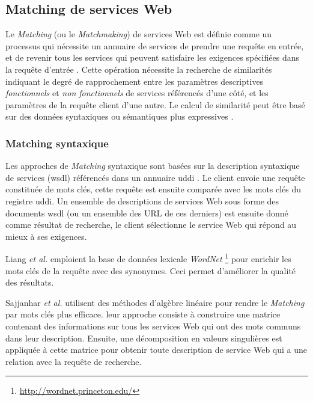   \subsection{Matching de services Web}
  \label{sec:ws-matching}
  Le \textit{Matching} (ou le \textit{Matchmaking}) de services Web
  est définie comme un processus qui nécessite un annuaire de services
  de prendre une requête en entrée, et de revenir tous les services
  qui peuvent satisfaire les exigences spécifiées dans la requête
  d'entrée \cite{li2004software}. Cette opération nécessite la
  recherche de similarités indiquant le degré de rapprochement entre
  les paramètres descriptives \textit{fonctionnels} et \textit{non
    fonctionnels} de services référencés d'une côté, et les paramètres
  de la requête client d'une autre.  Le calcul de similarité peut être
  basé sur des données syntaxiques ou sémantiques plus expressives
  \cite{elie2010}.

    \subsubsection{Matching syntaxique}
    \label{sec:matching-syntactique}
    Les approches de \textit{Matching} syntaxique sont basées sur la
    description syntaxique de services (\acrshort{wsdl}) référencés
    dans un annuaire \acrshort{uddi} \cite{clement2004uddi}. Le client
    envoie une requête constituée de mots clés, cette requête est
    ensuite comparée avec les mots clés du registre
    \acrshort{uddi}. Un ensemble de descriptions de services Web sous
    forme des documents \acrshort{wsdl} (ou un ensemble des
    \textsc{URL} de ces derniers) est ensuite donné comme résultat de
    recherche, le client sélectionne le service Web qui répond au
    mieux à ses exigences.

    Liang \textit{et al.} \cite{DBLP:journals/jwsr/LiangCSCL04}
    emploient la base de données lexicale \textit{WordNet}
    \footnote{\url{http://wordnet.princeton.edu/}}
    \cite{miller1990introduction} pour enrichir les mots clés de la
    requête avec des synonymes. Ceci permet d'améliorer la qualité des
    résultats.

    Sajjanhar \textit{et al.} \cite{sajjanhar2004algorithm} utilisent
    des méthodes d'algèbre linéaire pour rendre le \textit{Matching}
    par mots clés plus efficace. leur approche consiste à construire
    une matrice contenant des informations sur tous les services Web
    qui ont des mots communs dans leur description. Ensuite, une
    décomposition en valeurs singulières est appliquée à cette matrice
    pour obtenir toute description de service Web qui a une relation
    avec la requête de recherche.


